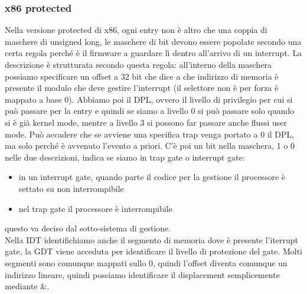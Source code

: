 \documentclass[12pt, oneside]{extbook}
\begin{document}
\subsubsection{x86 protected}
Nella versione protected di x86, ogni entry non è altro che una coppia di maschere di unsigned long, le maschere di bit devono essere popolate secondo una certa regola perché è il firmware a guardare lì dentro all'arrivo di un interrupt. La descrizione è strutturata secondo questa regola:
all'interno della maschera possiamo specificare un offset a 32 bit che dice a che indirizzo di memoria è presente il modulo che deve gestire l'interrupt (il selettore non è per forza è mappato a base 0). Abbiamo poi il DPL, ovvero il livello di privilegio per cui si può passare per la entry e quindi se siamo a livello 0 si può passare solo quando si è già kernel mode, mentre a livello 3 si possono far passare anche flussi user mode. Può accadere che se avviene una specifica trap venga portato a 0 il DPL, ma solo perché è avvenuto l'evento a priori. C'è poi un bit nella maschera, 1 o 0 nelle due descrizioni, indica se siamo in trap gate o interrupt gate:
\begin{itemize}
\item in un interrupt gate, quando parte il codice per la gestione il processore è settato su non interrompibile
\item nel trap gate il processore è interrompibile
\end{itemize}
questo va deciso dal sotto-sistema di gestione.\\
Nella IDT identifichiamo anche il segmento di memoria dove è presente l'iterrupt gate, la GDT viene acceduta per identificare il livello di protezione del gate. Molti segmenti sono comunque mappati sullo 0, quindi l'offset diventa comunque un indirizzo lineare, quindi possiamo identificare il displacement semplicemente mediante \&.
\end{document}
